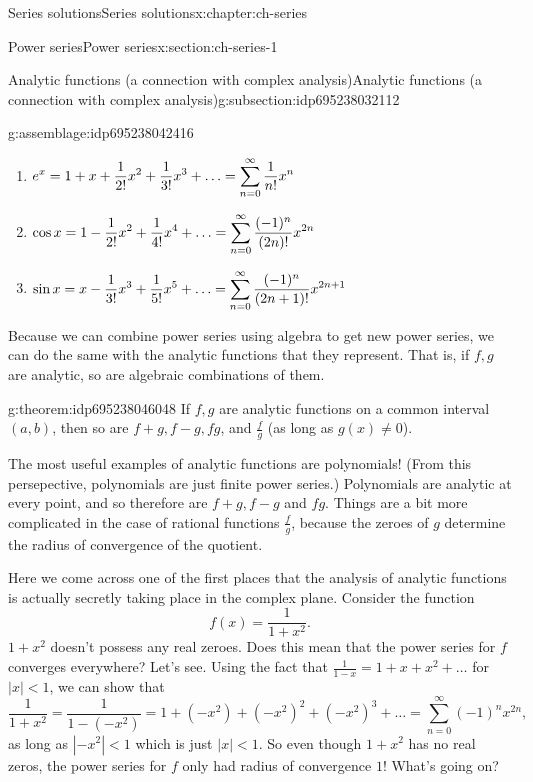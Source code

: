\documentclass[oneside,10pt,]{book}
\numberwithin{equation}{section}
\newcommand{\abs}[1]{\left\vert#1\right\vert}
\numberwithin{equation}{section}
\newcommand{\lt}{<}
\begin{document}
\begin{chapterptx}{Series solutions}{}{Series solutions}{}{}{x:chapter:ch-series}
\begin{sectionptx}{Power series}{}{Power series}{}{}{x:section:ch-series-1}
\begin{subsectionptx}{Analytic functions (a connection with complex analysis)}{}{Analytic functions (a connection with complex analysis)}{}{}{g:subsection:idp695238032112}
\begin{assemblage}{}{g:assemblage:idp695238042416}
%
\begin{enumerate}
\item{}\(\displaystyle \displaystyle e^x = 1 + x + \frac{1}{2!} x^2 + \frac{1}{3!} x^3 + \ldots = \sum_{n=0}^\infty \frac{1}{n!} x^n\)%
\item{}\(\displaystyle \displaystyle \cos x = 1 - \frac{1}{2!} x^2 + \frac{1}{4!} x^4 + \ldots =   \sum_{n=0}^\infty \frac{(-1)^n}{(2n)!} x^{2n}\)%
\item{}\(\displaystyle \displaystyle \sin x = x - \frac{1}{3!} x^3 + \frac{1}{5!} x^5 + \ldots =   \sum_{n=0}^\infty \frac{(-1)^n}{(2n + 1)!} x^{2n+ 1}\)%
\end{enumerate}
%
\end{assemblage}
Because we can combine power series using algebra to get new power series, we can do the same with the analytic functions that they represent. That is, if \(f, g\) are analytic, so are algebraic combinations of them.%
\begin{theorem}{}{}{g:theorem:idp695238046048}%
If \(f, g\) are analytic functions on a common interval \((a,b)\), then so are \(f + g, f - g, fg\), and \(\frac{f}{g}\) (as long as \(g(x) \neq 0\)).%
\end{theorem}
The most useful examples of analytic functions are polynomials! (From this persepective, polynomials are just finite power series.) Polynomials are analytic at every point, and so therefore are \(f + g, f - g\) and \(f g\). Things are a bit more complicated in the case of rational functions \(\frac{f}{g}\), because the zeroes of \(g\) determine the radius of convergence of the quotient.%
\par
Here we come across one of the first places that the analysis of analytic functions is actually secretly taking place in the complex plane. Consider the function%
\begin{equation*}
f(x) = \frac{1}{1+x^2}.
\end{equation*}
\(1 + x^2\) doesn't possess any real zeroes. Does this mean that the power series for \(f\) converges everywhere? Let's see. Using the fact that \(\frac{1}{1 - x} = 1 + x + x^2 + \ldots\) for \(\abs{x} \lt 1\), we can show that%
\begin{equation*}
\frac{1}{1 + x^2} = \frac{1}{1 - (-x^2)} = 1 + (-x^2) + (-x^2)^2 + (-x^2)^3 + \ldots = \sum_{n=0}^\infty (-1)^n x^{2n},
\end{equation*}
as long as \(\abs{-x^2} \lt 1\) which is just \(\abs{x} \lt 1\). So even though \(1 + x^2\) has no real zeros, the power series for \(f\) only had radius of convergence \(1\)! What's going on?%

\end{subsectionptx}
\end{sectionptx}
\end{chapterptx}
\end{document}
